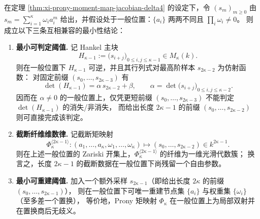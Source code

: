 \begin{corollary}\label{cor:xi-prony-decision-vs-reconstruction-one-sample-gap}
在定理 \ref{thm:xi-prony-moment-map-jacobian-delta4} 的设定下，令 \((s_m)_{m\ge 0}\) 由
\(
s_m=\sum_{i=1}^{\kappa}\omega_i a_i^{m}
\)
给出，并假设处于一般位置：\(\{a_i\}\) 两两不同且 \(\prod_i\omega_i\neq 0\)。
则成立以下三条互相兼容的最小性结论：
\begin{enumerate}
  \item \textbf{最小可判定阈值.}
        记 Hankel 主块
        \[
        H_{\kappa-1}:=\bigl(s_{i+j}\bigr)_{0\le i,j\le \kappa-1}\in M_{\kappa}(k).
        \]
        则在一般位置下 \(H_{\kappa-1}\) 可逆，并且其行列式对最高阶样本 \(s_{2\kappa-2}\) 为仿射函数：
        对固定前缀 \((s_0,\dots,s_{2\kappa-3})\) 有
        \[
        \det(H_{\kappa-1})=\alpha\,s_{2\kappa-2}+\beta,
        \qquad
        \alpha=\det\!\bigl(s_{i+j}\bigr)_{0\le i,j\le \kappa-2}.
        \]
        因而在 \(\alpha\neq 0\) 的一般位置上，仅凭更短前缀 \((s_0,\dots,s_{2\kappa-3})\) 不能判定 \(\det(H_{\kappa-1})\) 的消失/非消失，
        而给出长度 \(2\kappa-1\) 的前缀 \((s_0,\dots,s_{2\kappa-2})\) 则可直接完成该判定。
  \item \textbf{截断纤维维数律.}
        记截断矩映射
        \[
        \Phi_{\kappa}^{\langle 2\kappa-1\rangle}:(a_1,\dots,a_\kappa,\omega_1,\dots,\omega_\kappa)\longmapsto (s_0,\dots,s_{2\kappa-2})\in k^{2\kappa-1}.
        \]
        则在上述一般位置的 Zariski 开集上，\(\Phi_{\kappa}^{\langle 2\kappa-1\rangle}\) 的纤维为一维光滑代数簇；
        换言之，长度 \(2\kappa-1\) 的截断数据在一般位置下尚残留一个自由参数。
  \item \textbf{最小可重建阈值.}
        加入一个额外采样 \(s_{2\kappa-1}\)（即给出长度 \(2\kappa\) 的前缀 \((s_0,\dots,s_{2\kappa-1})\)），
        则在一般位置下可唯一重建节点集 \(\{a_i\}\) 与权重集 \(\{\omega_i\}\)（至多差一个置换），
        等价地，Prony 矩映射 \(\Phi_{\kappa}\) 在一般位置上为局部双射并在置换商后无歧义。
\end{enumerate}
\end{corollary}
